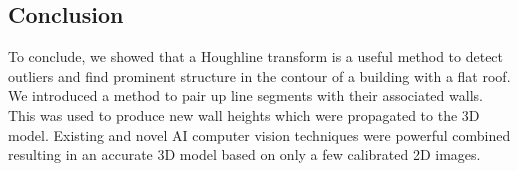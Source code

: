 \documentclass[10pt]{article}
\begin{document}
{%

\subsection{Conclusion}


To conclude, we showed that a Houghline transform is a useful method to detect outliers and find prominent structure in the contour of a building with a flat roof. We introduced a method to pair up line segments with their associated walls. This was used to produce new wall heights which were propagated to the 3D model.
Existing and novel AI computer vision techniques were powerful combined resulting in an accurate 3D model based on only a few calibrated 2D images. 

}
\end{document}
